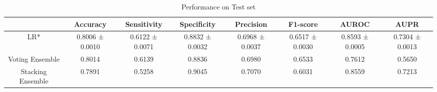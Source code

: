 \begin{table}[h!]
    \centering
    \caption{Performance on Test set}
    \begin{adjustbox}{width=\textwidth}
    \begin{tabular}{|c|c|c|c|c|c|c|c|}
    \hline
      & Accuracy & Sensitivity & Specificity & Precision & F1-score & AUROC & AUPR \\
    \hline
    LR* & 0.8006 ± 0.0010 & 0.6122 ± 0.0071 & 0.8832 ± 0.0032 & 0.6968 ± 0.0037 & 0.6517 ± 0.0030 & 0.8593 ± 0.0005 & 0.7304 ± 0.0013 \\
    \hline
    Voting Ensemble & 0.8014 & 0.6139 & 0.8836 & 0.6980 & 0.6533 & 0.7612 & 0.5650 \\
    \hline
    Stacking Ensemble & 0.7891 & 0.5258 & 0.9045 & 0.7070 & 0.6031 & 0.8559 & 0.7213 \\
    \hline
    \end{tabular}
    \end{adjustbox}
    \end{table}
    